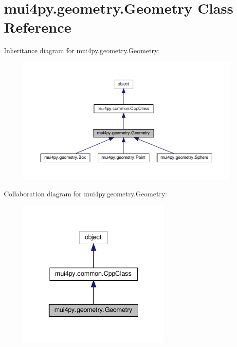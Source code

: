 \hypertarget{classmui4py_1_1geometry_1_1_geometry}{}\section{mui4py.\+geometry.\+Geometry Class Reference}
\label{classmui4py_1_1geometry_1_1_geometry}


Inheritance diagram for mui4py.\+geometry.\+Geometry\+:
\nopagebreak
\begin{figure}[H]
\begin{center}
\leavevmode
\includegraphics[width=350pt]{classmui4py_1_1geometry_1_1_geometry__inherit__graph}
\end{center}
\end{figure}


Collaboration diagram for mui4py.\+geometry.\+Geometry\+:
\nopagebreak
\begin{figure}[H]
\begin{center}
\leavevmode
\includegraphics[width=217pt]{classmui4py_1_1geometry_1_1_geometry__coll__graph}
\end{center}
\end{figure}
